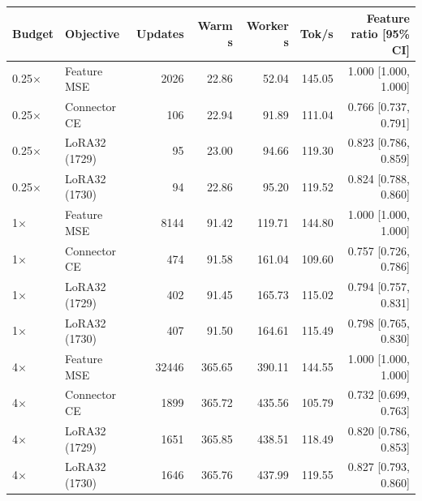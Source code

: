 \begin{tabular}{llrrrrr}
\toprule
Budget & Objective & Updates & Warm s & Worker s & Tok/s & Feature ratio [95\% CI] \\
\midrule
0.25$\times$ & Feature MSE & 2026 & 22.86 & 52.04 & 145.05 & 1.000 [1.000, 1.000] \\
0.25$\times$ & Connector CE & 106 & 22.94 & 91.89 & 111.04 & 0.766 [0.737, 0.791] \\
0.25$\times$ & LoRA32 (1729) & 95 & 23.00 & 94.66 & 119.30 & 0.823 [0.786, 0.859] \\
0.25$\times$ & LoRA32 (1730) & 94 & 22.86 & 95.20 & 119.52 & 0.824 [0.788, 0.860] \\
\midrule
1$\times$ & Feature MSE & 8144 & 91.42 & 119.71 & 144.80 & 1.000 [1.000, 1.000] \\
1$\times$ & Connector CE & 474 & 91.58 & 161.04 & 109.60 & 0.757 [0.726, 0.786] \\
1$\times$ & LoRA32 (1729) & 402 & 91.45 & 165.73 & 115.02 & 0.794 [0.757, 0.831] \\
1$\times$ & LoRA32 (1730) & 407 & 91.50 & 164.61 & 115.49 & 0.798 [0.765, 0.830] \\
\midrule
4$\times$ & Feature MSE & 32446 & 365.65 & 390.11 & 144.55 & 1.000 [1.000, 1.000] \\
4$\times$ & Connector CE & 1899 & 365.72 & 435.56 & 105.79 & 0.732 [0.699, 0.763] \\
4$\times$ & LoRA32 (1729) & 1651 & 365.85 & 438.51 & 118.49 & 0.820 [0.786, 0.853] \\
4$\times$ & LoRA32 (1730) & 1646 & 365.76 & 437.99 & 119.55 & 0.827 [0.793, 0.860] \\
\bottomrule
\end{tabular}

